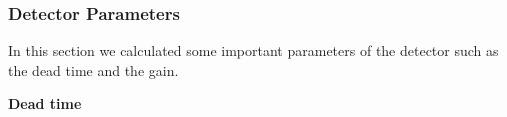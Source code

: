 		\subsubsection{Detector Parameters} %
		
		In this section we calculated some important parameters of the detector such as the dead time and the gain. %
		
		\textbf{Dead time}\\
		
